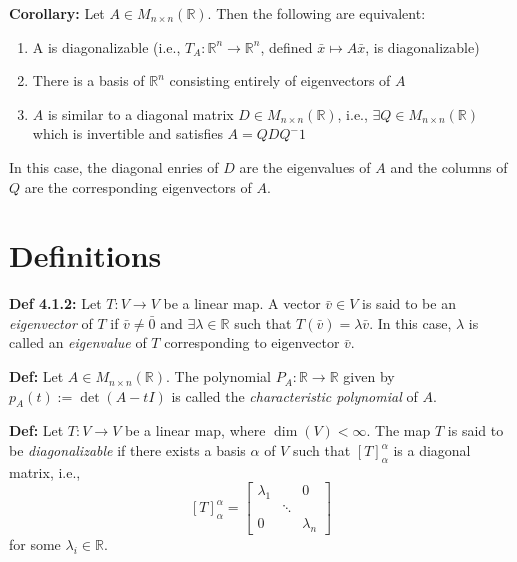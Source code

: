 \bigskip 

\noindent 
\textbf{Corollary:} Let $A \in M_{n \times n}(\mathbb{R})$. Then the following are equivalent:
\begin{enumerate}
    \item A is diagonalizable (i.e., $T_A:\mathbb{R}^n \rightarrow \mathbb{R}^n$, defined $\bar x \mapsto A\bar x$, is diagonalizable)
    \item There is a basis of $\mathbb{R}^n$ consisting entirely of eigenvectors of $A$ 
    \item $A$ is similar to a diagonal matrix $D \in M_{n \times n}(\mathbb{R})$, i.e., $\exists Q \in M_{n \times n}(\mathbb{R})$ which is invertible and satisfies $A=QDQ^-1$
\end{enumerate}
In this case, the diagonal enries of $D$ are the eigenvalues of $A$ and the columns of $Q$ are the corresponding eigenvectors of $A$.

\pagebreak 

\section*{Definitions}
\textbf{Def 4.1.2:} Let $T: V \rightarrow V$ be a linear map. A vector $\bar v \in V$ is said to be an \textit{eigenvector} of $T$ if $\bar v \ne \bar 0$ and $\exists \lambda \in \mathbb{R}$ such that $T(\bar v)=\lambda \bar v$. In this case, $\lambda$ is called an \textit{eigenvalue} of $T$ corresponding to eigenvector $\bar v$.

\bigskip 

\noindent 
\textbf{Def:} Let $A \in M_{n \times n}(\mathbb{R})$. The polynomial $P_A:\mathbb{R} \rightarrow \mathbb{R}$ given by $p_A(t):=\det(A-tI)$ is called the \textit{characteristic polynomial} of $A$.

\bigskip 

\noindent 
\textbf{Def:} Let $T: V \rightarrow V$ be a linear map, where $\dim(V) < \infty$. The map $T$ is said to be \textit{diagonalizable} if there exists a basis $\alpha$ of $V$ such that $[T]_\alpha^\alpha$ is a diagonal matrix, i.e., 
\[[T]_\alpha^\alpha = 
\begin{bmatrix}
    \lambda_1 & & 0 \\ 
     & \ddots \\
    0 & & \lambda_n
\end{bmatrix} \]
for some $\lambda_i \in \mathbb{R}$.